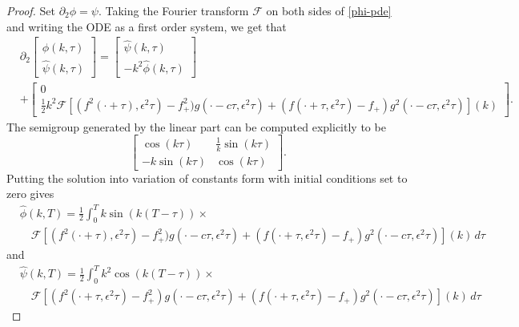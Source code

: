 \documentclass[oneside,reqno]{amsart}
\begin{document}
\begin{proof}
	Set \(\partial_2 \phi = \psi\). Taking the Fourier transform \(\mathcal F\) on both sides of \cref{phi-pde} and writing the ODE as a first order system, we get that 
	\begin{equation*}
		\begin{aligned}
			&\partial_2 \begin{bmatrix} \hat \phi(k,\tau) \\ \hat \psi(k,\tau) \end{bmatrix} = \begin{bmatrix}\hat \psi(k,\tau) \\ -k^2 \hat\phi(k,\tau) \end{bmatrix} \\ &+ \begin{bmatrix}
				0 \\   \frac 1 2 k^2 \mathcal F[ (f^2(\cdot+\tau),\epsilon^2\tau)-f_+^2)g(\cdot-c\tau,\epsilon^2\tau) +(f(\cdot+\tau,\epsilon^2\tau)-f_+)g^2(\cdot-c\tau,\epsilon^2\tau)](k)
			\end{bmatrix}.
		\end{aligned}
	\end{equation*}
	The semigroup generated by the linear part can be computed explicitly to be
	\begin{equation*}
		\begin{bmatrix}
			\cos(k\tau)  & \frac 1 k \sin(k \tau) \\
			-k\sin(k\tau) & \cos(k\tau)
		\end{bmatrix}.
	\end{equation*} 
	Putting the solution into variation of constants form with initial conditions set to zero gives
	\begin{equation*}
		\begin{aligned}
			&\hat  \phi(k,T) = \frac 1 2 \int_0^Tk\sin(k(T-\tau)) \times\\
			&\quad\mathcal F[ (f^2(\cdot+\tau),\epsilon^2\tau)-f_+^2)g(\cdot-c\tau,\epsilon^2\tau) +(f(\cdot+\tau,\epsilon^2\tau)-f_+)g^2(\cdot-c\tau,\epsilon^2\tau)](k)\, d\tau
		\end{aligned}
	\end{equation*}
	and 
	\begin{equation}\label{psi-fourier-transform}
		\begin{aligned}
			&\hat  \psi(k,T) = \frac 1 2 \int_0^Tk^2\cos(k(T-\tau)) \times\\
			&\quad\mathcal F[ (f^2(\cdot+\tau,\epsilon^2\tau)-f_+^2)g(\cdot-c\tau,\epsilon^2\tau) +(f(\cdot+\tau,\epsilon^2\tau)-f_+)g^2(\cdot-c\tau,\epsilon^2\tau)](k)\, d\tau

\end{aligned}
\end{equation}
\end{proof}
\end{document}
